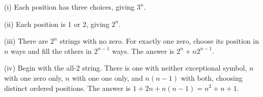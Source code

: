(i) Each position has three choices, giving $\boxed{3^n}$.

(ii) Each position is 1 or 2, giving $\boxed{2^n}$.

(iii) There are $2^n$ strings with no zero. For exactly one zero, choose its position in $n$ ways and fill the others in $2^{n-1}$ ways. The answer is $\boxed{2^n+n2^{n-1}}$.

(iv) Begin with the all-2 string. There is one with neither exceptional symbol, $n$ with one zero only, $n$ with one one only, and $n(n-1)$ with both, choosing distinct ordered positions. The answer is $\boxed{1+2n+n(n-1)=n^2+n+1}$.
